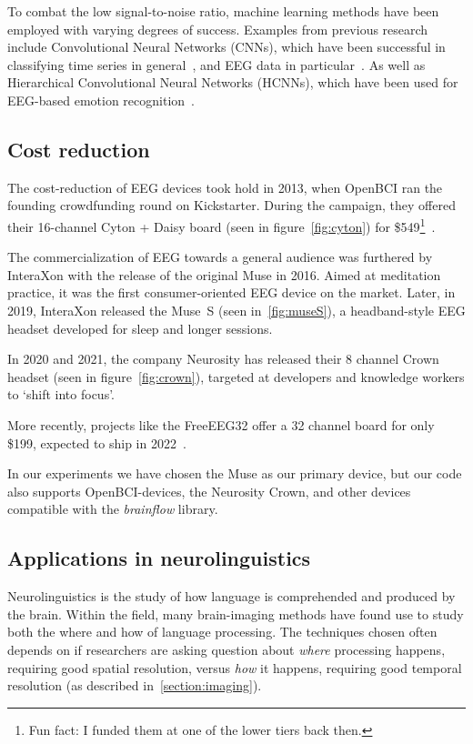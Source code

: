    To combat the low signal-to-noise ratio, machine learning methods have been employed with varying degrees of success. Examples from previous research include Convolutional Neural Networks (CNNs), which have been successful in classifying time series in general~\cite{zhao_convolutional_2017}, and EEG data in particular~\cite{schirrmeister_deep_2017}. As well as Hierarchical Convolutional Neural Networks (HCNNs), which have been used for EEG-based emotion recognition~\cite{li_hierarchical_2018}.

    \subsection*{Cost reduction}

    The cost-reduction of EEG devices took hold in 2013, when OpenBCI ran the founding crowdfunding round on Kickstarter. During the campaign, they offered their 16-channel Cyton + Daisy board (seen in figure~\ref{fig:cyton}) for \$549\footnote{Fun fact: I funded them at one of the lower tiers back then.}~\cite{noauthor_openbci_nodate}.

    The commercialization of EEG towards a general audience was furthered by InteraXon with the release of the original Muse in 2016. Aimed at meditation practice, it was the first consumer-oriented EEG device on the market. Later, in 2019, InteraXon released the Muse~S (seen in~\ref{fig:museS}), a headband-style EEG headset developed for sleep and longer sessions.

    In 2020 and 2021, the company Neurosity has released their 8 channel Crown headset (seen in figure~\ref{fig:crown}), targeted at developers and knowledge workers to `shift into focus'.

    More recently, projects like the FreeEEG32 offer a 32 channel board for only \$199, expected to ship in 2022~\cite{noauthor_freeeeg32_nodate}.

    In our experiments we have chosen the Muse as our primary device, but our code also supports OpenBCI-devices, the Neurosity Crown, and other devices compatible with the \emph{brainflow} library.

    \subsection*{Applications in neurolinguistics}

        Neurolinguistics is the study of how language is comprehended and produced by the brain. Within the field, many brain-imaging methods have found use to study both the where and how of language processing. The techniques chosen often depends on if researchers are asking question about \emph{where} processing happens, requiring good spatial resolution, versus \emph{how} it happens, requiring good temporal resolution (as described in~\ref{section:imaging}).

